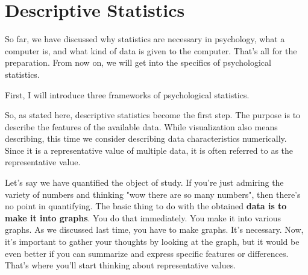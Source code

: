 \documentclass{ltjbook}
\begin{document}
\VerbatimFootnotes
\chapter{Descriptive Statistics}
\label{m05_descriptives}

So far, we have discussed why statistics are necessary in psychology, what a computer is, and what kind of data is given to the computer. That's all for the preparation. From now on, we will get into the specifics of psychological statistics.

First, I will introduce three frameworks of psychological statistics.


So, as stated here, descriptive statistics become the first step. The purpose is to describe the features of the available data. While visualization also means describing, this time we consider describing data characteristics numerically. Since it is a representative value of multiple data, it is often referred to as the representative value.

Let's say we have quantified the object of study. If you're just admiring the variety of numbers and thinking "wow there are so many numbers", then there's no point in quantifying. The basic thing to do with the obtained \textbf{data is to make it into graphs}. You do that immediately. You make it into various graphs. As we discussed last time, you have to make graphs. It's necessary. Now, it's important to gather your thoughts by looking at the graph, but it would be even better if you can summarize and express specific features or differences. That's where you'll start thinking about representative values.
\end{document}
